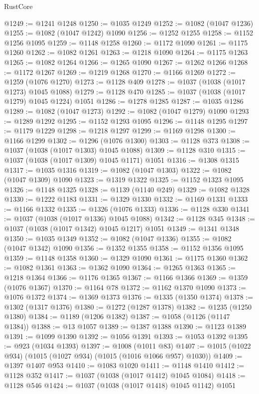 \begin{lexlean}{RustCore}
\begin{coremodule}
@1249 := @1241 @1248
@1250 := @1035 @1249
@1252 := @1082 (@1047 @1236)
@1255 := @1082 (@1047 @1242) @1090
@1256 := @1252 @1255
@1258 := @1152 @1256 @1095
@1259 := @1148 @1258
@1260 := @1172 @1090
@1261 := @1175 @1260
@1262 := @1082 @1261
@1263 := @1218 @1090
@1264 := @1175 @1263
@1265 := @1082 @1264
@1266 := @1265 @1090
@1267 := @1262 @1266
@1268 := @1172 @1267
@1269 := @1219 @1268
@1270 := @1166 @1269
@1272 := @1259 (@1076 @1270)
@1273 := @1128 @409
@1278 := @1037 (@1038 (@1017 @1273) @1045 @1088)
@1279 := @1128 @470
@1285 := @1037 (@1038 (@1017 @1279) @1045 @1224) @1051
@1286 := @1278 @1285
@1287 := @1035 @1286
@1289 := @1082 (@1047 @1273)
@1292 := @1082 (@1047 @1279) @1090
@1293 := @1289 @1292
@1295 := @1152 @1293 @1095
@1296 := @1148 @1295
@1297 := @1179 @1229
@1298 := @1218 @1297
@1299 := @1169 @1298
@1300 := @1166 @1299
@1302 := @1296 (@1076 @1300)
@1303 := @1128 @373
@1308 := @1037 (@1038 (@1017 @1303) @1045 @1088)
@1309 := @1128 @310
@1315 := @1037 (@1038 (@1017 @1309) @1045 @1171) @1051
@1316 := @1308 @1315
@1317 := @1035 @1316
@1319 := @1082 (@1047 @1303)
@1322 := @1082 (@1047 @1309) @1090
@1323 := @1319 @1322
@1325 := @1152 @1323 @1095
@1326 := @1148 @1325
@1328 := @1139 (@1140 @249)
@1329 := @1082 @1328
@1330 := @1222 @1183
@1331 := @1329 @1330
@1332 := @1169 @1331
@1333 := @1166 @1332
@1335 := @1326 (@1076 @1333)
@1336 := @1128 @330
@1341 := @1037 (@1038 (@1017 @1336) @1045 @1088)
@1342 := @1128 @345
@1348 := @1037 (@1038 (@1017 @1342) @1045 @1217) @1051
@1349 := @1341 @1348
@1350 := @1035 @1349
@1352 := @1082 (@1047 @1336)
@1355 := @1082 (@1047 @1342) @1090
@1356 := @1352 @1355
@1358 := @1152 @1356 @1095
@1359 := @1148 @1358
@1360 := @1329 @1090
@1361 := @1175 @1360
@1362 := @1082 @1361
@1363 := @1362 @1090
@1364 := @1265 @1363
@1365 := @1218 @1364
@1366 := @1176 @1365
@1367 := @1166 @1366
@1369 := @1359 (@1076 @1367)
@1370 := @1164 @78
@1372 := @1162 @1370 @1090
@1373 := @1076 @1372
@1374 := @1369 @1373
@1376 := @1335 (@1350 @1374)
@1378 := @1302 (@1317 @1376)
@1380 := @1272 (@1287 @1378)
@1382 := @1235 (@1250 @1380)
@1384 := @1189 (@1206 @1382)
@1387 := @1058 (@1126 (@1147 @1384))
@1388 := @13 @1057
@1389 := @1387 @1388
@1390 := @1123 @1389
@1391 := @1099 @1390
@1392 := @1056 @1391
@1393 := @1053 @1392
@1395 := @923 (@1034 @1393)
@1397 := @1008 (@1011 @83)
@1407 := @1015 (@1022 @934) (@1015 (@1027 @934) (@1015 (@1016 @1066 @957) @1030))
@1409 := @1397 @1407 @953
@1410 := @1083 @1020
@1411 := @1148 @1410
@1412 := @1128 @352
@1417 := @1037 (@1038 (@1017 @1412) @1045 @1084)
@1418 := @1128 @546
@1424 := @1037 (@1038 (@1017 @1418) @1045 @1142) @1051

\end{coremodule}
\end{lexlean}
